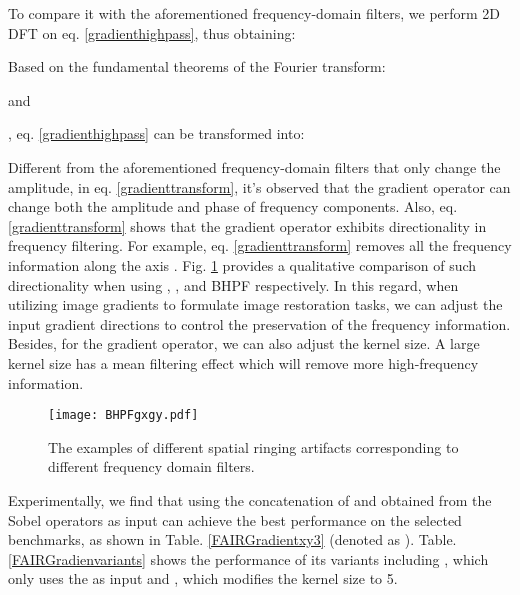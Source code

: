 \documentclass[5p, twocolumn]{elsarticle}[draft]
\begin{document}
To compare it with the aforementioned frequency-domain filters, we perform 2D DFT  on eq. \ref{gradienthighpass}, thus obtaining:

Based on the fundamental theorems of the Fourier transform:

and 

, eq. \ref{gradienthighpass} can be transformed into:

Different from the aforementioned frequency-domain filters that only change the amplitude, in eq. \ref{gradienttransform}, it's observed that the gradient operator can change both the amplitude and phase of frequency components. Also, eq. \ref{gradienttransform} shows that the gradient operator exhibits directionality in frequency filtering. For example, eq. \ref{gradienttransform} removes all the frequency information along the axis . Fig. \ref{BHPFgxgy} provides a qualitative comparison of such directionality when using , , and BHPF respectively. In this regard, when utilizing image gradients to formulate image restoration tasks, we can adjust the input gradient directions to control the preservation of the frequency information. Besides, for the gradient operator, we can also adjust the kernel size. A large kernel size has a mean filtering effect which will remove more high-frequency information. 

\begin{figure}[h]
    \centering
		\texttt{[image: BHPFgxgy.pdf]}
	\caption{The examples of different spatial ringing artifacts corresponding to different frequency domain filters.}
	\label{BHPFgxgy}
\end{figure}

Experimentally, we find that using the concatenation of  and  obtained from the  Sobel operators as input can achieve the best performance on the selected benchmarks, as shown in Table. \ref{FAIRGradientxy3} (denoted as ).  Table. \ref{FAIRGradienvariants} shows the performance of its variants including , which only uses the  as input and , which modifies the kernel size to 5.

\begin{table}[h]
\caption{Quantitative evaluation of the anomaly detection performance using the Sobel gradient operator as a high-frequency extractor. I-AUROC and P-AUROC refer to image-level and pixel-level AUROC respectively.}
\end{table}
\end{document}
